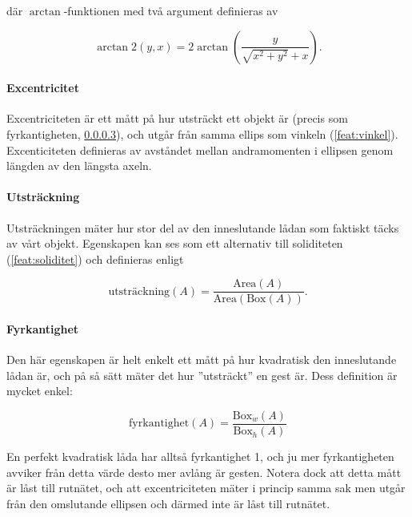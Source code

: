 \documentclass[../rapport_MVEX01-11-05]{subfiles}
\begin{document}
där $\arctan$-funktionen med två argument definieras av

\begin{equation*}
  \arctan\!2\left(y,x\right) = 2\arctan\left(
  \frac{y}{\sqrt{x^2+y^2}+x}
  \right).
\end{equation*}

\paragraph{Excentricitet}

Excentriciteten är ett mått på hur utsträckt ett objekt är (precis som
fyrkantigheten, \ref{feat:fyrkantighet}), och utgår från samma ellips
som vinkeln (\ref{feat:vinkel}). Excenticiteten definieras av avståndet
mellan andramomenten i ellipsen genom längden av den längsta axeln.

\paragraph{Utsträckning}

Utsträckningen mäter hur stor del av den inneslutande lådan som
faktiskt täcks av vårt objekt. Egenskapen kan ses som ett alternativ
till soliditeten (\ref{feat:soliditet}) och definieras enligt

\begin{equation*}
  \textrm{utsträckning}(A) =
  \frac{\textrm{Area}(A)}{\textrm{Area}(\textrm{Box}(A))}.
\end{equation*}

\paragraph{Fyrkantighet}
\label{feat:fyrkantighet}

Den här egenskapen är helt enkelt ett mått på hur kvadratisk den
inneslutande lådan är, och på så sätt mäter det hur ''utsträckt'' en
gest är. Dess definition är mycket enkel:

\begin{equation*}
  \textrm{fyrkantighet}(A) = \frac{\textrm{Box}_w(A)}{\textrm{Box}_h(A)}
\end{equation*}

En perfekt kvadratisk låda har alltså fyrkantighet 1, och ju mer
fyrkantigheten avviker från detta värde desto mer avlång är gesten.
Notera dock att detta mått är låst till rutnätet, och att
excentriciteten mäter i princip samma sak men utgår från den
omslutande ellipsen och därmed inte är låst till rutnätet.
\end{document}
